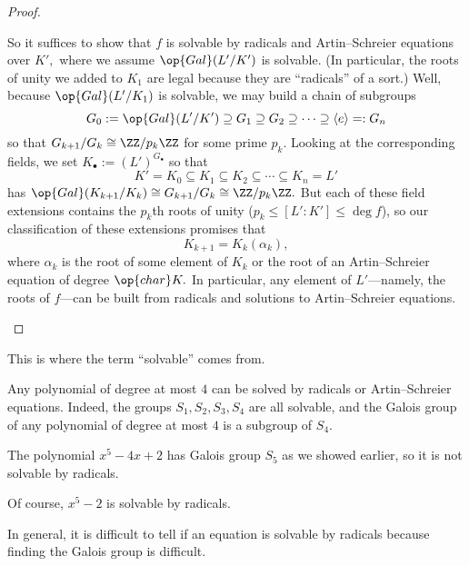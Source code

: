 \begin{proof}
\begin{itemize}
		So it suffices to show that $f$ is solvable by radicals and Artin--Schreier equations over $K',$ where we assume $\op{Gal}(L'/K')$ is solvable. (In particular, the roots of unity we added to $K_1$ are legal because they are ``radicals'' of a sort.) Well, because $\op{Gal}(L'/K_1)$ is solvable, we may build a chain of subgroups
		\[G_0:=\op{Gal}(L'/K')\supseteq G_1\supseteq G_2\supseteq\cdots\supseteq\langle e\rangle=:G_n\]
		so that $G_{k+1}/G_k\cong\ZZ/p_k\ZZ$ for some prime $p_k.$ Looking at the corresponding fields, we set $K_\bullet:=(L')^{G_\bullet}$ so that
		\[K'=K_0\subseteq K_1\subseteq K_2\subseteq\cdots\subseteq K_n=L'\]
		has $\op{Gal}(K_{k+1}/K_k)\cong G_{k+1}/G_k\cong\ZZ/p_k\ZZ.$ But each of these field extensions contains the $p_k$th roots of unity ($p_k\le[L':K']\le\deg f$), so our classification of these extensions promises that
		\[K_{k+1}=K_k(\alpha_k),\]
		where $\alpha_k$ is the root of some element of $K_k$ or the root of an Artin--Schreier equation of degree $\op{char}K.$ In particular, any element of $L'$---namely, the roots of $f$---can be built from radicals and solutions to Artin--Schreier equations.
		\qedhere
	\end{itemize}
\end{proof}
\begin{remark}
	This is where the term ``solvable'' comes from.
\end{remark}
\begin{ex}
	Any polynomial of degree at most $4$ can be solved by radicals or Artin--Schreier equations. Indeed, the groups $S_1,S_2,S_3,S_4$ are all solvable, and the Galois group of any polynomial of degree at most $4$ is a subgroup of $S_4.$
\end{ex}
\begin{example}
	The polynomial $x^5-4x+2$ has Galois group $S_5$ as we showed earlier, so it is not solvable by radicals.
\end{example}
\begin{example}
	Of course, $x^5-2$ is solvable by radicals.
\end{example}
In general, it is difficult to tell if an equation is solvable by radicals because finding the Galois group is difficult.

